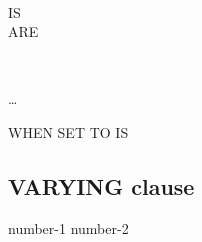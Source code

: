 \begin{1=}
   \\
\end{1=}
\begin{0-1}
  IS \\
  ARE
\end{0-1}
\begin{1=}
  \literal
  \begin{0-1}
    \begin{1=}
       \\
    \end{1=}
    \literal
  \end{0-1}
\end{1=} \ldots

\begin{0-1}
  WHEN SET TO  IS \literal
\end{0-1}

\subsection{VARYING clause}
 \identifier {} number-1  number-2

